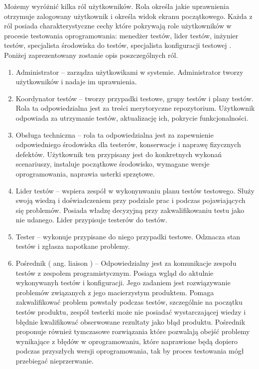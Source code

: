 Możemy wyróżnić kilka ról użytkowników. Rola określa jakie uprawnienia otrzymuje zalogowany użytkownik i określa widok ekranu początkowego. Każda z ról posiada charakterystyczne cechy które pokrywają role użytkowników w procesie testowania oprogramowania: menedżer testów, lider testów, inżynier testów, specjalista środowiska do testów, specjalista konfiguracji testowej \cite{peopleWare}. Poniżej zaprezentowany zostanie opis poszczególnych ról.
\begin{enumerate}
  \item Administrator --  zarządza użytkowikami w systemie. Administrator tworzy użytkowników i nadaje im uprawnienia.
  \item Koordynator testów -- tworzy przypadki testowe, grupy testów i plany testów. Rola ta odpowiedzialna jest za treści merytoryczne repozytorium. Użytkownik odpowiada za utrzymanie testów, aktualizację ich, pokrycie funkcjonalności. 
  \item Obsługa techniczna -- rola ta odpowiedzialna jest za zapewnienie odpowiedniego środowiska dla testerów, konserwacje i naprawę fizycznych defektów. Użytkownik ten przypisany jest do konkretnych wykonań scenariuszy, instaluje początkowe środowisko, wymagane wersje oprogramowania, naprawia usterki sprzętowe.
  \item Lider testów -- wspiera zespół w wykonynwaniu planu testów testowego. Służy swoją wiedzą i doświadczeniem przy podziale prac i podczas pojawiających się problemów. Posiada władzę decyzyjną przy zakwalifikowaniu testu jako nie udanego. Lider przypisuje testerów do testów.
  \item Tester --  wykonuje przypisane do niego przypadki testowe. Odznacza stan testów i zgłasza napotkane problemy.
  \item Pośrednik ( ang. liaison ) --  Odpowiedzialny jest za komunikacje zespołu testów z zespołem programistycznym. Posiaga wgląd do aktulnie wykonywanyh testów i konfiguracji. Jego zadaniem jest rozwiązywanie problemów związanych z jego macierzystym produktem. Pomaga zakwalifikować problem powstały podczas testów, szczególnie na początku testów produktu, zespół testerki może nie posiadać wystarczającej wiedzy i błędnie kwalifikować obserwowane rezultaty jako błąd produktu. Pośrednik proponuje również tymczasowe rozwiązania które pozwalają obejść problemy wynikające z błędów w oprogramowaniu, które naprawione będą dopiero podczas przyszłych wersji oprogramowania, tak by proces testowania mógł przebiegać nieprzerwanie.
\end{enumerate}
  
